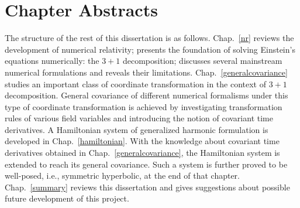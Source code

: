 \section{Chapter Abstracts}\label{abstracts}
The structure of the rest of this dissertation is as follows. Chap.~\ref{nr} reviews the development of numerical relativity; presents the foundation of solving Einstein's equations numerically: the $3 + 1$ decomposition; discusses several mainstream numerical formulations and reveals their limitations. Chap.~\ref{generalcovariance} studies an important class of coordinate transformation in the context of $3 + 1$ decomposition. General covariance of different numerical formalisms under this type of coordinate transformation is achieved by investigating transformation rules of various field variables and introducing the notion of covariant time derivatives. A Hamiltonian system of generalized harmonic formulation is developed in Chap.~\ref{hamiltonian}. With the knowledge about covariant time derivatives obtained in Chap.~\ref{generalcovariance}, the Hamiltonian system is extended to reach its general covariance. Such a system is further proved to be well-posed, i.e., symmetric hyperbolic, at the end of that chapter. Chap.~\ref{summary} reviews this dissertation and gives suggestions about possible future development of this project. 
